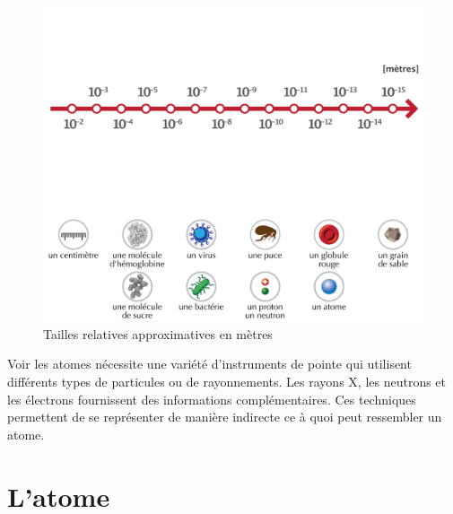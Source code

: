 \documentclass[
  11pt,
  a4paper,
  openany]{book}
\begin{document}
\begin{figure}

{\centering \includegraphics[width=1\linewidth]{images/ordre-grandeur-ex} 

}

\caption{Tailles relatives approximatives en mètres}\label{fig:ordre-grandeur-ex}
\end{figure}

Voir les atomes nécessite une variété d'instruments de pointe qui utilisent différents types de particules ou de rayonnements. Les rayons X, les neutrons et les électrons fournissent des informations complémentaires. Ces techniques permettent de se représenter de manière indirecte ce à quoi peut ressembler un atome.

\chapter{L'atome}\label{latome}
\end{document}
